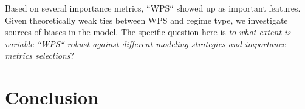 \documentclass[12pt]{article}
\begin{document}
Based on several importance metrics, ``WPS`` showed up as important features. Given theoretically weak ties between WPS and regime type, we investigate sources of biases in the model. The specific question here is \textit{to what extent is variable ``WPS`` robust against different modeling strategies and importance metrics selections}?

\section{Conclusion}


\begin{appendices}


\end{appendices}

\printbibliography
\end{document}
